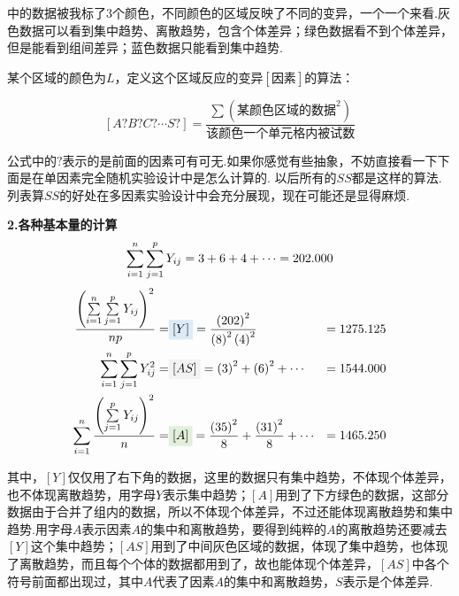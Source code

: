 中的数据被我标了3个颜色，不同颜色的区域反映了不同的变异，一个一个来看.灰色数据可以看到集中趋势、离散趋势，包含个体差异；绿色数据看不到个体差异，但是能看到组间差异；蓝色数据只能看到集中趋势.

某个区域的颜色为$L$，定义这个区域反应的变异$[\text{因素}]$的算法：

\[
\left[ A?B?C?\cdots S? \right] =\frac{\sum{\left( \text{某颜色区域的数据}^2 \right)}}{\text{该颜色一个单元格内被试数}}
\]

公式中的$?$表示的是前面的因素可有可无.如果你感觉有些抽象，不妨直接看一下下面是在单因素完全随机实验设计中是怎么计算的.
以后所有的$SS$都是这样的算法.列表算$SS$的好处在多因素实验设计中会充分展现，现在可能还是显得麻烦.

\textbf{2.各种基本量的计算}
    \[
        \sum\limits_{i=1}^{n} \sum\limits_{j=1}^{p}Y_{ij} = 3+6+4+\cdots=202.000\\
    \]
    \begin{align*}
            \frac{
                \left(
        	\sum\limits_{i=1}^{n} \sum\limits_{j=1}^{p}Y_{ij}
                \right)^2}
            {np}=& \colorbox[rgb]{ .867,  .922,  .969}{$[Y]$} = 
            \frac{
                \left(
        	    202
                \right)^2}
                {
                    \left(
        	           8
                    \right)^2
                    \left(
                        4
                    \right)^2
                }&=1275.125\\
            \sum\limits_{i=1}^{n} \sum\limits_{j=1}^{p}Y_{ij}^2=
            & \colorbox[rgb]{ .949,  .949,  .949}{$[AS]$} = 
            \left(
            	3
            \right)^2 +
            \left(
            	6
            \right)^2    +\cdots &=1544.000\\
            \sum\limits_{i=1}^{n}
            \frac
                {\left(
	            \sum\limits_{j=1}^{p}Y_{ij}
                \right)^2}
                {n}=
            &\colorbox[rgb]{ .886,  .937,  .855}{$[A]$}=
            \frac{\left(35\right)^2}{8}+\frac{\left(31\right)^2}{8}+\cdots&=1465.250            
    \end{align*}

其中，$[Y]$仅仅用了右下角的数据，这里的数据只有集中趋势，不体现个体差异，也不体现离散趋势，用字母$Y$表示集中趋势；$[A]$用到了下方绿色的数据，这部分数据由于合并了组内的数据，所以不体现个体差异，不过还能体现离散趋势和集中趋势.用字母$A$表示因素$A$的集中和离散趋势，要得到纯粹的$A$的离散趋势还要减去$[Y]$这个集中趋势；$[AS]$用到了中间灰色区域的数据，体现了集中趋势，也体现了离散趋势，而且每个个体的数据都用到了，故也能体现个体差异，$[AS]$中各个符号前面都出现过，其中$A$代表了因素$A$的集中和离散趋势，$S$表示是个体差异.

